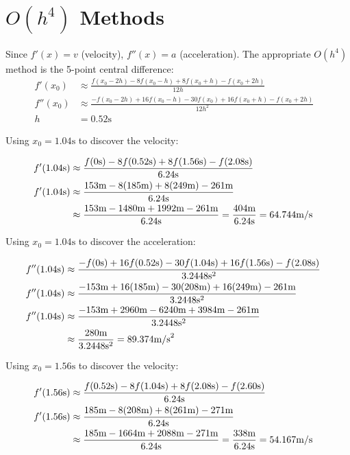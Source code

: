 \section{$O(h^{4})$ Methods}

	Since $f'(x) = v$ (velocity), $f''(x) = a$ (acceleration). The appropriate $O(h^{4})$ method is the 5-point central difference:
	\begin{align}
		f'(x_{0}) &\approx \frac{f(x_{0}-2h)-8f(x_{0}-h)+8f(x_{0}+h)-f(x_{0}+2h)}{12h}& \\
		f''(x_{0}) &\approx \frac{-f(x_{0}-2h)+16f(x_{0}-h)-30f(x_{0})+16f(x_{0}+h)-f(x_{0}+2h)}{12h^{2}}& \\
		h &= 0.52\text{s}&
	\end{align}

	Using $x_{0} = 1.04\text{s}$ to discover the velocity:

	\begin{align}
		f'(1.04\text{s}) &\approx \frac{f(0\text{s})-8f(0.52\text{s})+8f(1.56\text{s})-f(2.08\text{s})}{6.24\text{s}}& \\
		f'(1.04\text{s}) &\approx \frac{153\text{m}-8(185\text{m})+8(249\text{m})-261\text{m}}{6.24\text{s}}& \notag \\
		&\approx \frac{153\text{m}-1480\text{m}+1992\text{m}-261\text{m}}{6.24\text{s}} = \frac{404\text{m}}{6.24\text{s}} = 64.744 \text{m/s}&
	\end{align}

	Using $x_{0} = 1.04\text{s}$ to discover the acceleration:

	\begin{align}
		f''(1.04\text{s}) &\approx \frac{-f(0\text{s})+16f(0.52\text{s})-30f(1.04\text{s})+16f(1.56\text{s})-f(2.08\text{s})}{3.2448\text{s}^{2}}& \\
		f''(1.04\text{s}) &\approx \frac{-153\text{m}+16(185\text{m})-30(208\text{m})+16(249\text{m})-261\text{m}}{3.2448\text{s}^{2}}& \notag \\
		f''(1.04\text{s}) &\approx \frac{-153\text{m}+2960\text{m}-6240\text{m}+3984\text{m}-261\text{m}}{3.2448\text{s}^{2}}& \notag \\
		&\approx \frac{280\text{m}}{3.2448\text{s}^{2}} = 89.374\text{m/s}^{2}&
	\end{align}

	Using $x_{0} = 1.56\text{s}$ to discover the velocity:

	\begin{align}
		f'(1.56\text{s}) &\approx \frac{f(0.52\text{s})-8f(1.04\text{s})+8f(2.08\text{s})-f(2.60\text{s})}{6.24\text{s}}& \\
		f'(1.56\text{s}) &\approx \frac{185\text{m}-8(208\text{m})+8(261\text{m})-271\text{m}}{6.24\text{s}}& \notag \\
		&\approx \frac{185\text{m}-1664\text{m}+2088\text{m}-271\text{m}}{6.24\text{s}} = \frac{338\text{m}}{6.24\text{s}} = 54.167\text{m/s}&
	\end{align}

